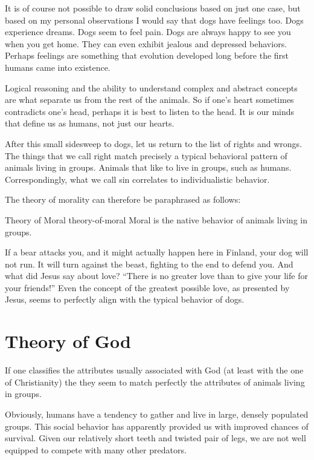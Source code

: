 It is of course not possible to draw solid conclusions based on
just one case, but based on my personal observations I would say
that dogs have feelings too. Dogs experience dreams. Dogs seem to
feel pain. Dogs are always happy to see you when you get home. They
can even exhibit jealous and depressed behaviors. Perhaps feelings
are something that evolution developed long before the first humans
came into existence.

Logical reasoning and the ability to understand complex and
abstract concepts are what separate us from the rest of the
animals. So if one's heart sometimes contradicts one's head,
perhaps it is best to listen to the head. It is our minds that
define us as humans, not just our hearts.

After this small sidesweep to dogs, let us return to the list of
rights and wrongs. The things that we call right match precisely a
typical behavioral pattern of animals living in groups. Animals
that like to live in groups, such as humans. Correspondingly, what
we call sin correlates to individualistic behavior.

The theory of morality can therefore be paraphrased as follows:

\begin{principle}{Theory of Moral}
{theory-of-moral}
Moral is the native behavior of animals living in groups.
\end{principle}

If a bear attacks you, and it might actually happen here in
Finland, your dog will not run. It will turn against the beast,
fighting to the end to defend you. And what did Jesus say about
love? ``There is no greater love than to give your life for your
friends!'' Even the concept of the greatest possible love, as
presented by Jesus, seems to perfectly align with the typical
behavior of dogs.

\section{Theory of God}

If one classifies the attributes usually associated with God (at least with
the one of Christianity) the they seem to match perfectly the attributes
of animals living in groups.

Obviously, humans have a tendency to gather and live in large, densely
populated groups. This social behavior has apparently provided us
with improved chances of survival. Given our relatively short
teeth and twisted pair of legs, we are not well equipped to compete
with many other predators.

